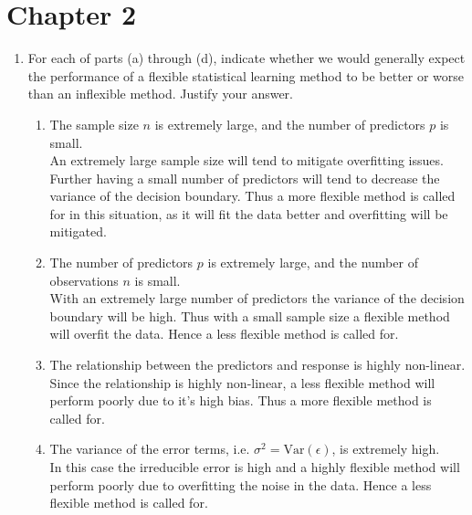 \documentclass[11pt]{article}
\begin{document}

\section*{Chapter 2}
\begin{enumerate}
\subsection*{Conceptual}
\item  For each of parts (a) through (d), indicate whether we would generally expect the performance of a flexible statistical learning method to be better or worse than an inflexible method.  Justify your answer.
\begin{enumerate}
\item The sample size $n$ is extremely large, and the number of predictors $p$ is small.\\

An extremely large sample size will tend to mitigate overfitting issues.  Further having a small number of predictors will tend to decrease the variance of the decision boundary.  Thus a more flexible method is called for in this situation, as it will fit the data better and overfitting will be mitigated. 
\item The number of predictors $p$ is extremely large, and the number of observations $n$ is small.\\

With an extremely large number of predictors the variance of the decision boundary will be high.  Thus with a small sample size a flexible method will overfit the data.  Hence a less flexible method is called for.
\item The relationship between the predictors and response is highly non-linear.\\

Since the relationship is highly non-linear, a less flexible method will perform poorly due to it's high bias.  Thus a more flexible method is called for. 
\item The variance of the error terms, i.e. $\sigma^2=\text{Var}(\epsilon)$, is extremely high. \\

In this case the irreducible error is high and a highly flexible method will perform poorly due to overfitting the noise in the data.  Hence a less flexible method is called for.
\end{enumerate}


\end{enumerate}
\end{document}

